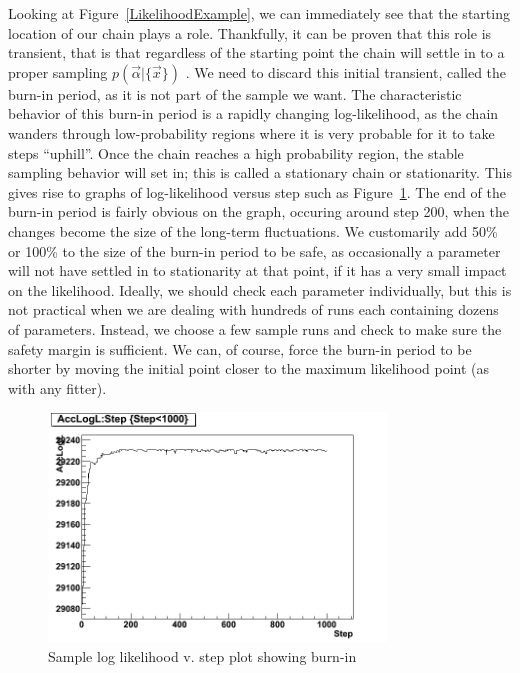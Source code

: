 Looking at \mbox{Figure \ref{LikelihoodExample}}, we can immediately
see that the starting location of our chain plays a role.  Thankfully,
it can be proven that this role is transient, that is that regardless
of the starting point the chain will settle in to a proper sampling
$p(\vec{\alpha}|\{\vec{x}\})$ \cite{NealReport}.  We need to discard
this initial transient, called the burn-in period, as it is not part
of the sample we want.  The characteristic behavior of this burn-in
period is a rapidly changing log-likelihood, as the chain wanders
through low-probability regions where it is very probable for it to
take steps ``uphill''.  Once the chain reaches a high probability
region, the stable sampling behavior will set in; this is called a
stationary chain or stationarity.  This gives rise to graphs of
log-likelihood versus step such as \mbox{Figure
\ref{LikelihoodConvergence}}.  The end of the burn-in period is fairly
obvious on the graph, occuring around step 200, when the changes become
the size of the long-term fluctuations.  We customarily add 50\% or
100\% to the size of the burn-in period to be safe, as occasionally a
parameter will not have settled in to stationarity at that point, if
it has a very small impact on the likelihood.  Ideally, we should
check each parameter individually, but this is not practical when we
are dealing with hundreds of runs each containing dozens of
parameters.  Instead, we choose a few sample runs and check to make
sure the safety margin is sufficient.  We can, of course, force the
burn-in period to be shorter by moving the initial point closer to the
maximum likelihood point (as with any fitter).

\begin{figure}
\centering
\includegraphics[width=0.8\textwidth]{Figures/MCMC/LogL}
\caption{Sample log likelihood v. step plot showing burn-in
\label{LikelihoodConvergence}}
\end{figure}

